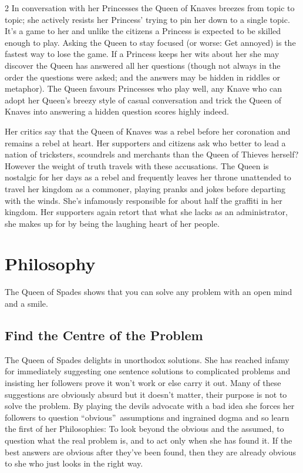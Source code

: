 \begin{multicols}{2}
In conversation with her Princesses the Queen of Knaves breezes from topic to topic; she actively resists her Princess' trying to pin her down to a single topic. It's a game to her and unlike the citizens a Princess is expected to be skilled enough to play. Asking the Queen to stay focused (or worse: Get annoyed) is the fastest way to lose the game. If a Princess keeps her wits about her she may discover the Queen has answered all her questions (though not always in the order the questions were asked; and the answers may be hidden in riddles or metaphor). The Queen favours Princesses who play well, any Knave who can adopt her Queen's breezy style of casual conversation and trick the Queen of Knaves into answering a hidden question scores highly indeed.

Her critics say that the Queen of Knaves was a rebel before her coronation and remains a rebel at heart. Her supporters and citizens ask who better to lead a nation of tricksters, scoundrels and merchants than the Queen of Thieves herself? However the weight of truth travels with these accusations. The Queen is nostalgic for her days as a rebel and frequently leaves her throne unattended to travel her kingdom as a commoner, playing pranks and jokes before departing with the winds. She's infamously responsible for about half the graffiti in her kingdom. Her supporters again retort that what she lacks as an administrator, she makes up for by being the laughing heart of her people. 

\section*{Philosophy}

The Queen of Spades shows that you can solve any problem with an open mind and a smile.

\subsection*{Find the Centre of the Problem}

The Queen of Spades delights in unorthodox solutions. She has reached infamy for immediately suggesting one sentence solutions to complicated problems and insisting her followers prove it won't work or else carry it out. Many of these suggestions are obviously absurd but it doesn't matter, their purpose is not to solve the problem. By playing the devils advocate with a bad idea she forces her followers to question \textquotedblleft obvious\textquotedblright\, assumptions and ingrained dogma and so learn the first of her Philosophies: To look beyond the obvious and the assumed, to question what the real problem is, and to act only when she has found it. If the best answers are obvious after they've been found, then they are already obvious to she who just looks in the right way.


\end{multicols}
